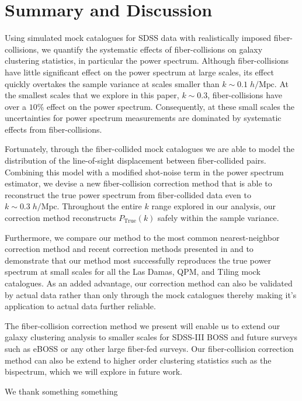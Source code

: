 \documentclass{emulateapj}
\begin{document}
\section{Summary and Discussion} 
Using simulated mock catalogues for SDSS data with realistically imposed fiber-collisions, we quantify the systematic effects of fiber-collisions on galaxy clustering statistics, in particular the power spectrum. Although fiber-collisions have little significant effect on the power spectrum at large scales, its effect quickly overtakes the sample variance at scales smaller than $k \sim 0.1 \;h/\mathrm{Mpc}$. At the smallest scales that we explore in this paper, $k \sim 0.3$, fiber-collisions have over a $10 \%$ effect on the power spectrum. Consequently, at these small scales the uncertainties for power spectrum measurements are dominated by systematic effects from fiber-collisions. 

Fortunately, through the fiber-collided mock catalogues we are able to model the distribution of the line-of-sight displacement between fiber-collided pairs. Combining this model with a modified shot-noise term in the power spectrum estimator, we devise a new fiber-collision correction method that is able to reconstruct the true power spectrum from fiber-collided data even to $k \sim 0.3 \;h/\mathrm{Mpc}$. Throughout the entire $k$ range explored in our analysis, our correction method reconstructs $P_\mathrm{True}(k)$ safely within the sample variance. 

Furthermore, we compare our method to the most common nearest-neighbor correction method and recent correction methods presented in \cite{Beutler:2014aa} and \cite{Gil-Marin:2014aa} to demonstrate that our method most successfully reproduces the true power spectrum at small scales for all the Las Damas, QPM, and Tiling mock catalogues. As an added advantage, our correction method can also be validated by actual data rather than only through the mock catalogues thereby making it's application to actual data further reliable. 

The fiber-collision correction method we present will enable us to extend our galaxy clustering analysis to smaller scales for SDSS-III BOSS and future surveys such as eBOSS or any other large fiber-fed surveys. Our fiber-collision correction method can also be extend to higher order clustering statistics such as the bispectrum, which we will explore in future work. 

\bigskip
We thank something something



\end{document}
